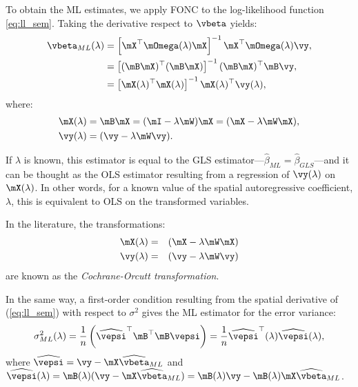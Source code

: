 To obtain the ML estimates, we apply FONC to the log-likelihood function \eqref{eq:ll_sem}. Taking the derivative respect to $\vbeta$ yields:
\begin{equation}\label{eq:beta_gls_ml}
  \begin{aligned}
\vbeta_{ML}(\lambda) & =\left[\mX^\top\mOmega(\lambda)\mX\right]^{-1}\mX^\top\mOmega(\lambda)\vy,\\
                     & = \left[(\mB\mX)^\top (\mB \mX)\right]^{-1} (\mB\mX)^\top \mB \vy, \\
                     & = \left[\mX(\lambda)^\top  \mX(\lambda)\right]^{-1} \mX(\lambda)^\top \vy(\lambda),
  \end{aligned}
\end{equation}
%
where:
\begin{equation}
  \begin{aligned}
\mX(\lambda) & = \mB\mX = (\mI - \lambda\mW)\mX = (\mX - \lambda\mW\mX), \\
\vy(\lambda) & = (\vy - \lambda \mW \vy).
  \end{aligned}
\end{equation}

If $\lambda$ is known, this estimator is equal to the GLS estimator---$\widehat{\beta}_{ML} = \widehat{\beta}_{GLS}$---and it can be thought as the OLS estimator resulting from a regression of $\vy(\lambda)$ on $\mX(\lambda)$. In other words, for a known value of the spatial autoregressive coefficient, $\lambda$, this is equivalent to OLS on the transformed variables.

\begin{remark}
In the literature, the transformations:
\begin{eqnarray*}
\mX(\lambda) &=&(\mX - \lambda\mW\mX) \\
\vy(\lambda) &=& (\vy - \lambda \mW \vy)
\end{eqnarray*}
%
are known as the \emph{Cochrane-Orcutt transformation}.
\end{remark}

In the same way, a first-order condition resulting from the spatial derivative of (\ref{eq:ll_sem}) with respect to $\sigma^2$ gives the ML estimator for the error variance:
\begin{equation}
	\sigma^2_{ML}(\lambda) = \frac{1}{n}\left(\widehat{\vepsi}^\top\mB^\top\mB \vepsi\right)= \frac{1}{n}\widehat{\vepsi}^\top(\lambda)\widehat{\vepsi}(\lambda),
\end{equation}
%
where $\widehat{\vepsi} = \vy - \mX\widehat{\vbeta}_{ML}$ and $\widehat{\vepsi}(\lambda) = \mB(\lambda)(\vy - \mX\widehat{\vbeta}_{ML}) = \mB(\lambda)\vy - \mB(\lambda)\mX\widehat{\vbeta}_{ML}$. 

